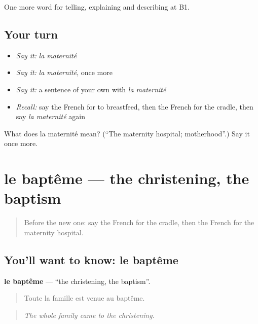 \begin{grammarlens}[title={What you've built}]
One more word for telling, explaining and describing at B1.
\end{grammarlens}

\subsection*{Your turn}
\begin{itemize}
\raggedright
  \item \emph{Say it:} \emph{la maternité}
  \item \emph{Say it:} \emph{la maternité}, once more
  \item \emph{Say it:} a sentence of your own with \emph{la maternité}
  \item \emph{Recall:} say the French for to breastfeed, then the French for the cradle, then say \emph{la maternité} again
\end{itemize}

\begin{tcolorbox}[breakable,colback=teal!4,colframe=teal!35!black,title={Before you move on}]
What does la maternité mean? (\textquotedblleft{}The maternity hospital; motherhood\textquotedblright{}.) Say it once more.
\end{tcolorbox}
\section[le baptême]{le baptême — the christening, the baptism}

\label{lesson:FR-C309-bapteme}



\begin{quote}
Before the new one: say the French for the cradle, then the French for the maternity hospital.
\end{quote}

\subsection*{You'll want to know: le baptême}
\textbf{le baptême} — \textquotedblleft{}the christening, the baptism\textquotedblright{}.

\begin{quote}
Toute la famille est venue au baptême.
\end{quote}

\begin{quote}
\emph{The whole family came to the christening.}
\end{quote}

